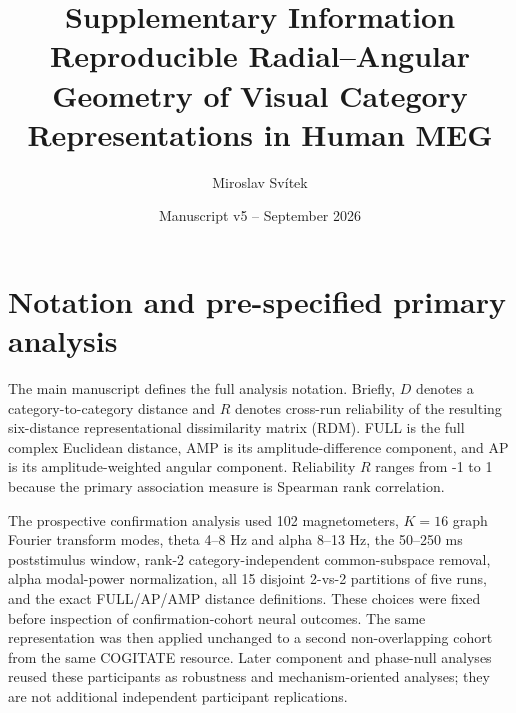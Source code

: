 \documentclass[11pt]{article}
\title{Supplementary Information\\\large Reproducible Radial--Angular Geometry of Visual Category Representations in Human MEG}
\author{Miroslav Svítek}
\date{Manuscript v5 -- September 2026}
\begin{document}
\maketitle
\linenumbers

\section{Notation and pre-specified primary analysis}
The main manuscript defines the full analysis notation. Briefly, $D$ denotes a category-to-category distance and $R$ denotes cross-run reliability of the resulting six-distance representational dissimilarity matrix (RDM). FULL is the full complex Euclidean distance, AMP is its amplitude-difference component, and AP is its amplitude-weighted angular component. Reliability $R$ ranges from -1 to 1 because the primary association measure is Spearman rank correlation.

The prospective confirmation analysis used 102 magnetometers, $K=16$ graph Fourier transform modes, theta 4--8 Hz and alpha 8--13 Hz, the 50--250 ms poststimulus window, rank-2 category-independent common-subspace removal, alpha modal-power normalization, all 15 disjoint 2-vs-2 partitions of five runs, and the exact FULL/AP/AMP distance definitions. These choices were fixed before inspection of confirmation-cohort neural outcomes. The same representation was then applied unchanged to a second non-overlapping cohort from the same COGITATE resource. Later component and phase-null analyses reused these participants as robustness and mechanism-oriented analyses; they are not additional independent participant replications.
\end{document}
